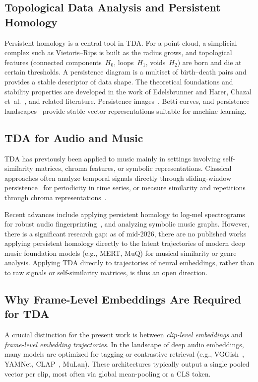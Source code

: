 \subsection{Topological Data Analysis and Persistent Homology}

Persistent homology is a central tool in TDA. For a point cloud, a simplicial complex such as Vietoris--Rips is built as the radius grows, and topological features (connected components~$H_0$, loops~$H_1$, voids~$H_2$) are born and die at certain thresholds. A persistence diagram is a multiset of birth--death pairs and provides a stable descriptor of data shape. The theoretical foundations and stability properties are developed in the work of Edelsbrunner and Harer, Chazal et~al.~\cite{cohen2007stability}, and related literature. Persistence images~\cite{adams2017persistence}, Betti curves, and persistence landscapes~\cite{bubenik2015statistical} provide stable vector representations suitable for machine learning.

\subsection{TDA for Audio and Music}

TDA has previously been applied to music mainly in settings involving self-similarity matrices, chroma features, or symbolic representations. Classical approaches often analyze temporal signals directly through sliding-window persistence~\cite{perea2015sliding} for periodicity in time series, or measure similarity and repetitions through chroma representations~\cite{serra2008chroma}. 

Recent advances include applying persistent homology to log-mel spectrograms for robust audio fingerprinting~\cite{reise2024topological}, and analyzing symbolic music graphs. However, there is a significant research gap: as of mid-2026, there are no published works applying persistent homology directly to the latent trajectories of modern deep music foundation models (e.g., MERT, MuQ) for musical similarity or genre analysis. Applying TDA directly to trajectories of neural embeddings, rather than to raw signals or self-similarity matrices, is thus an open direction.

\subsection{Why Frame-Level Embeddings Are Required for TDA}

A crucial distinction for the present work is between \textit{clip-level embeddings} and \textit{frame-level embedding trajectories}. In the landscape of deep audio embeddings, many models are optimized for tagging or contrastive retrieval (e.g., VGGish~\cite{hershey2017vggish}, YAMNet, CLAP~\cite{wu2023large}, MuLan). These architectures typically output a single pooled vector per clip, most often via global mean-pooling or a CLS token.

